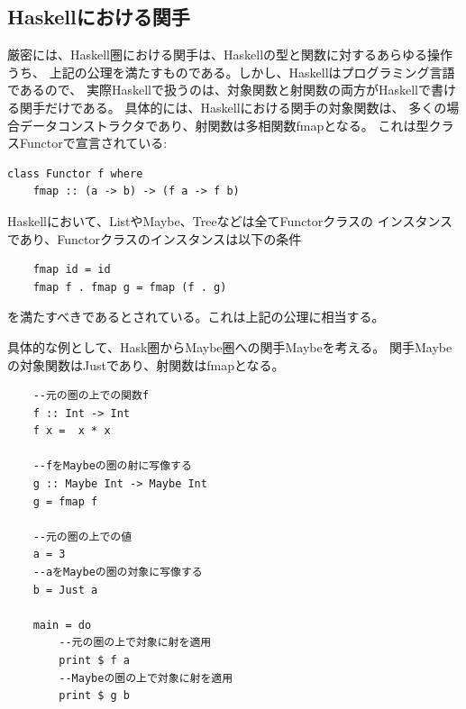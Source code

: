 \subsection{Haskellにおける関手}
厳密には、Haskell圏における関手は、Haskellの型と関数に対するあらゆる操作うち、
上記の公理を満たすものである。しかし、Haskellはプログラミング言語であるので、
実際Haskellで扱うのは、対象関数と射関数の両方がHaskellで書ける関手だけである。
具体的には、Haskellにおける関手の対象関数は、
多くの場合データコンストラクタであり、射関数は多相関数fmapとなる。
これは型クラスFunctorで宣言されている:

\begin{lstlisting}
class Functor f where
    fmap :: (a -> b) -> (f a -> f b)
\end{lstlisting}

Haskellにおいて、ListやMaybe、Treeなどは全てFunctorクラスの
インスタンスであり、Functorクラスのインスタンスは以下の条件
\begin{lstlisting}
    fmap id = id
    fmap f . fmap g = fmap (f . g)
\end{lstlisting}
を満たすべきであるとされている。これは上記の公理に相当する。

具体的な例として、Hask圏からMaybe圏への関手Maybeを考える。
関手Maybeの対象関数はJustであり、射関数はfmapとなる。
\begin{lstlisting}
    --元の圏の上での関数f
    f :: Int -> Int
    f x =  x * x

    --fをMaybeの圏の射に写像する
    g :: Maybe Int -> Maybe Int
    g = fmap f

    --元の圏の上での値
    a = 3
    --aをMaybeの圏の対象に写像する
    b = Just a

    main = do
        --元の圏の上で対象に射を適用
        print $ f a
        --Maybeの圏の上で対象に射を適用
        print $ g b
\end{lstlisting}


